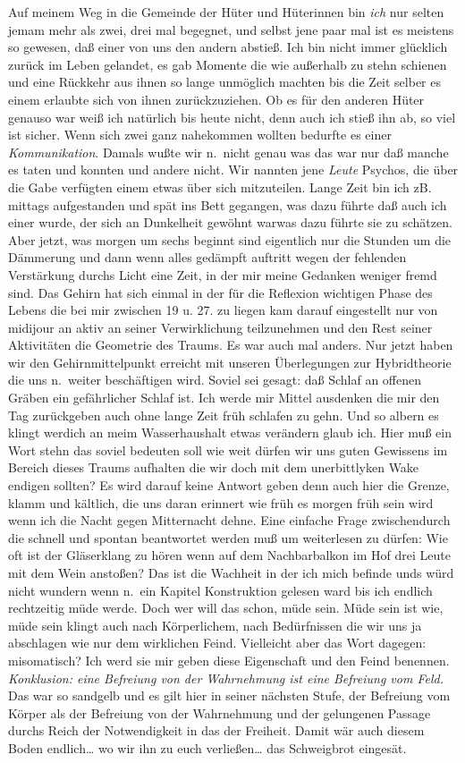 \documentclass[
]{article}
\begin{document}
Auf meinem Weg in die Gemeinde der Hüter und Hüterinnen bin \emph{ich}
nur selten jemam mehr als zwei, drei mal begegnet, und selbst jene paar
mal ist es meistens so gewesen, daß einer von uns den andern abstieß.
Ich bin nicht immer glücklich zurück im Leben gelandet, es gab Momente
die wie außerhalb zu stehn schienen und eine Rückkehr aus ihnen so lange
unmöglich machten bis die Zeit selber es einem erlaubte sich von ihnen
zurückzuziehen. Ob es für den anderen Hüter genauso war weiß ich
natürlich bis heute nicht, denn auch ich stieß ihn ab, so viel ist
sicher. Wenn sich zwei ganz nahekommen wollten bedurfte es einer
\emph{Kommunikation}. Damals wußte wir n.~nicht genau was das war nur
daß manche es taten und konnten und andere nicht. Wir nannten jene
\emph{Leute} Psychos, die über die Gabe verfügten einem etwas über sich
mitzuteilen. Lange Zeit bin ich zB. mittags aufgestanden und spät ins
Bett gegangen, was dazu führte daß auch ich einer wurde, der sich an
Dunkelheit gewöhnt warwas dazu führte sie zu schätzen. Aber jetzt, was
morgen um sechs beginnt sind eigentlich nur die Stunden um die Dämmerung
und dann wenn alles gedämpft auftritt wegen der fehlenden Verstärkung
durchs Licht eine Zeit, in der mir meine Gedanken weniger fremd sind.
Das Gehirn hat sich einmal in der für die Reflexion wichtigen Phase des
Lebens die bei mir zwischen 19 u. 27. zu liegen kam darauf eingestellt
nur von midijour an aktiv an seiner Verwirklichung teilzunehmen und den
Rest seiner Aktivitäten die Geometrie des Traums. Es war auch mal
anders. Nur jetzt haben wir den Gehirnmittelpunkt erreicht mit unseren
Überlegungen zur Hybridtheorie die uns n.~weiter beschäftigen wird.
Soviel sei gesagt: daß Schlaf an offenen Gräben ein gefährlicher Schlaf
ist. Ich werde mir Mittel ausdenken die mir den Tag zurückgeben auch
ohne lange Zeit früh schlafen zu gehn. Und so albern es klingt werdich
an meim Wasserhaushalt etwas verändern glaub ich. Hier muß ein Wort
stehn das soviel bedeuten soll wie weit dürfen wir uns guten Gewissens
im Bereich dieses Traums aufhalten die wir doch mit dem unerbittlyken
Wake endigen sollten? Es wird darauf keine Antwort geben denn auch hier
die Grenze, klamm und kältlich, die uns daran erinnert wie früh es
morgen früh sein wird wenn ich die Nacht gegen Mitternacht dehne. Eine
einfache Frage zwischendurch die schnell und spontan beantwortet werden
muß um weiterlesen zu dürfen: Wie oft ist der Gläserklang zu hören wenn
auf dem Nachbarbalkon im Hof drei Leute mit dem Wein anstoßen? Das ist
die Wachheit in der ich mich befinde unds würd nicht wundern wenn n.~ein
Kapitel Konstruktion gelesen ward bis ich endlich rechtzeitig müde
werde. Doch wer will das schon, müde sein. Müde sein ist wie, müde sein
klingt auch nach Körperlichem, nach Bedürfnissen die wir uns ja
abschlagen wie nur dem wirklichen Feind. Vielleicht aber das Wort
dagegen: misomatisch? Ich werd sie mir geben diese Eigenschaft und den
Feind benennen. \emph{Konklusion: eine Befreiung von der Wahrnehmung ist
eine Befreiung vom Feld.} Das war so sandgelb und es gilt hier in seiner
nächsten Stufe, der Befreiung vom Körper als der Befreiung von der
Wahrnehmung und der gelungenen Passage durchs Reich der Notwendigkeit in
das der Freiheit. Damit wär auch diesem Boden endlich\ldots{} wo wir ihn
zu euch verließen\ldots{} das Schweigbrot eingesät.
\end{document}
